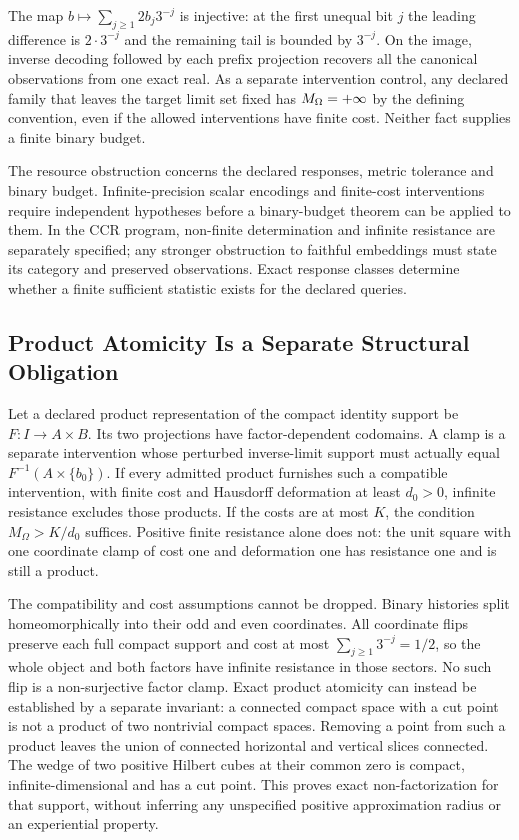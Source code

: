 \begin{example}\label{ex:unbounded-precision-control}
The map $b\mapsto\sum_{j\geq1}2b_j3^{-j}$ is injective: at the first unequal bit $j$ the leading difference is $2\cdot3^{-j}$ and the remaining tail is bounded by $3^{-j}$. On the image, inverse decoding followed by each prefix projection recovers all the canonical observations from one exact real. As a separate intervention control, any declared family that leaves the target limit set fixed has $M_\Omega=+\infty$ by the defining convention, even if the allowed interventions have finite cost. Neither fact supplies a finite binary budget.
\end{example}

\begin{remark}
The resource obstruction concerns the declared responses, metric tolerance and binary budget. Infinite-precision scalar encodings and finite-cost interventions require independent hypotheses before a binary-budget theorem can be applied to them. In the CCR program, non-finite determination and infinite resistance are separately specified; any stronger obstruction to faithful embeddings must state its category and preserved observations. Exact response classes determine whether a finite sufficient statistic exists for the declared queries.
\end{remark}

\subsection{Product Atomicity Is a Separate Structural Obligation}
Let a declared product representation of the compact identity support be $F:I\to A\times B$. Its two projections have factor-dependent codomains. A clamp is a separate intervention whose perturbed inverse-limit support must actually equal $F^{-1}(A\times\{b_0\})$. If every admitted product furnishes such a compatible intervention, with finite cost and Hausdorff deformation at least $d_0>0$, infinite resistance excludes those products. If the costs are at most $K$, the condition $M_\Omega>K/d_0$ suffices. Positive finite resistance alone does not: the unit square with one coordinate clamp of cost one and deformation one has resistance one and is still a product.

The compatibility and cost assumptions cannot be dropped. Binary histories split homeomorphically into their odd and even coordinates. All coordinate flips preserve each full compact support and cost at most $\sum_{j\ge1}3^{-j}=1/2$, so the whole object and both factors have infinite resistance in those sectors. No such flip is a non-surjective factor clamp. Exact product atomicity can instead be established by a separate invariant: a connected compact space with a cut point is not a product of two nontrivial compact spaces. Removing a point from such a product leaves the union of connected horizontal and vertical slices connected. The wedge of two positive Hilbert cubes at their common zero is compact, infinite-dimensional and has a cut point. This proves exact non-factorization for that support, without inferring any unspecified positive approximation radius or an experiential property.

